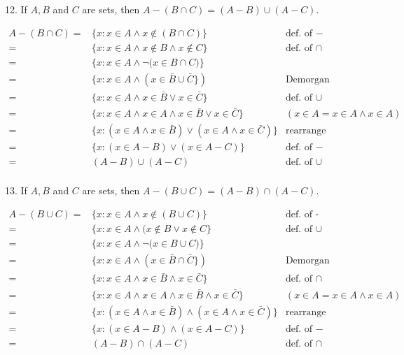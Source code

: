 \documentclass{idrisMemo}
\newcommand{\set}[1]{\{#1\}}
\begin{document}
\begin{prooflist}{12. If $A, B$ and $C$ are sets, then $A-(B \cap C)=(A-B) \cup(A-C)$.}
\item
\begin{align*}
    A-(B \cap C)=& \set{x: x\in A \land x\notin(B \cap C)} & \text{def. of }-\\
    =& \set{x: x\in A \land x\notin B \land x\notin C} & \text{def. of $\cap$}\\
    =& \set{x: x\in A \land \neg{(x\in B \cap C})} & \\
    =& \set{x: x\in A \land (x\in \bar{B} \cup \bar{C}}) & \text{Demorgan}\\
    =& \set{x: x\in A \land x\in \bar{B} \lor x\in\bar{C}} & \text{def. of }\cup\\
    =& \set{x: x\in A \land x\in A \land x\in \bar{B} \lor x\in\bar{C}} & (x\in A = x\in A \land x \in A) \\
    =& \set{x: (x\in A \land x\in \bar{B}) \lor (x\in A \land x\in\bar{C})} & \text{rearrange}\\
    =& \set{x: (x\in A  - B) \lor (x\in A - C)} & \text{def. of }-\\
    =& (A - B) \cup (A-C) & \text{def. of }\cup\\
\end{align*}
\end{prooflist}


\begin{prooflist}{13. If $A, B$ and $C$ are sets, then $A-(B \cup C)=(A-B) \cap(A-C)$.}
\item
\begin{align*}
    A-(B \cup C)=& \set{x: x\in A \land x\notin(B \cup C)} & \text{def. of -}\\
    =& \set{x: x\in A \land (x\notin B \lor x\notin C} & \text{def. of $\cup$}\\
    =& \set{x: x\in A \land \neg{(x\in B \cup C})} & \\
    =& \set{x: x\in A \land (x\in \bar{B} \cap \bar{C}}) & \text{Demorgan}\\
    =& \set{x: x\in A \land x\in \bar{B} \land x\in\bar{C}} & \text{def. of }\cap\\
    =& \set{x: x\in A \land x\in A \land x\in \bar{B} \land x\in\bar{C}} & (x\in A = x\in A \land x \in A) \\
    =& \set{x: (x\in A \land x\in \bar{B}) \land (x\in A \land x\in\bar{C})} & \text{rearrange}\\
    =& \set{x: (x\in A  - B) \land (x\in A - C)} & \text{def. of }-\\
    =& (A - B) \cap (A-C) & \text{def. of }\cap
\end{align*}
\end{prooflist}
\end{document}
